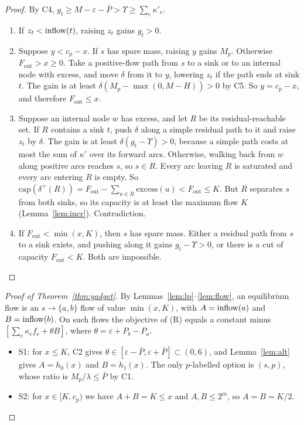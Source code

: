 \begin{proof}
By C4, $g_t\ge M-\varepsilon-\bar P>\Upsilon\ge\sum_e\kappa'_e$.
\begin{enumerate}[nosep]
\item If $z_t<\mathrm{inflow}(t)$, raising $z_t$ gains $g_t>0$.
\item Suppose $y<c_p-x$. If $s$ has spare mass, raising $y$ gains $M_p$. Otherwise
$F_{\mathrm{out}}>x\ge0$. Take a positive-flow path from $s$ to a sink or to an internal node with excess,
and move $\delta$ from it to $y$, lowering $z_t$ if the path ends at sink $t$. The gain is at least
$\delta(M_p-\max(0,M-H))>0$ by C5. So $y=c_p-x$, and therefore $F_{\mathrm{out}}\le x$.
\item Suppose an internal node $w$ has excess, and let $R$ be its residual-reachable set. If $R$ contains
a sink $t$, push $\delta$ along a simple residual path to it and raise $z_t$ by $\delta$. The gain is at
least $\delta(g_t-\Upsilon)>0$, because a simple path costs at most the sum of $\kappa'$ over its forward
arcs. Otherwise, walking back from $w$ along positive arcs reaches $s$, so $s\in R$. Every arc leaving
$R$ is saturated and every arc entering $R$ is empty. So
$\mathrm{cap}(\delta^+(R))=F_{\mathrm{out}}-\sum_{u\in R}\mathrm{excess}(u)<F_{\mathrm{out}}\le K$. But
$R$ separates $s$ from both sinks, so its capacity is at least the maximum flow $K$
(Lemma~\ref{lem:incr}). Contradiction.
\item If $F_{\mathrm{out}}<\min(x,K)$, then $s$ has spare mass. Either a residual path from $s$ to a
sink exists, and pushing along it gains $g_t-\Upsilon>0$, or there is a cut of capacity
$F_{\mathrm{out}}<K$. Both are impossible.\qedhere
\end{enumerate}
\end{proof}

\begin{proof}[Proof of Theorem~\ref{thm:gadget}]
By Lemmas~\ref{lem:lp}--\ref{lem:flow}, an equilibrium flow is an $s\to\{a,b\}$ flow of value
$\min(x,K)$, with $A=\mathrm{inflow}(a)$ and $B=\mathrm{inflow}(b)$. On such flows the objective of (R) equals a
constant minus $[\sum_e\kappa_ef_e+\theta B]$, where $\theta=\varepsilon+P_b-P_a$.
\begin{itemize}[nosep]
\item S1: for $x\le K$, C2 gives $\theta\in[\varepsilon-\bar P,\varepsilon+\bar P]\subset(0,6)$, and
Lemma~\ref{lem:alt} gives $A=h_0(x)$ and $B=h_1(x)$. The only $p$-labelled option is $(s,p)$, whose
ratio is $M_p/\lambda\le\bar P$ by C1.
\item S2: for $x\in[K,c_p)$ we have $A+B=K\le x$ and $A,B\le2^m$, so $A=B=K/2$.\qedhere
\end{itemize}
\end{proof}

